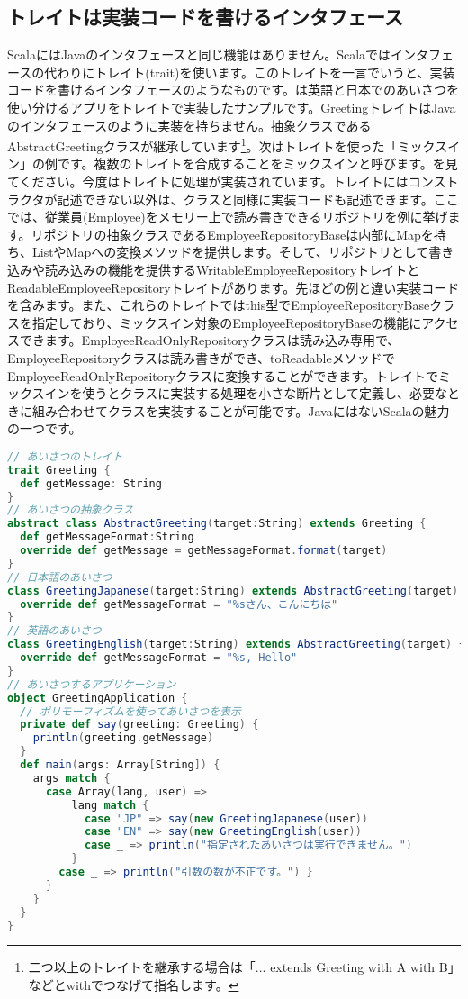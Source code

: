 \subsection{トレイトは実装コードを書けるインタフェース}
ScalaにはJavaのインタフェースと同じ機能はありません。Scalaではインタフェースの代わりにトレイト(trait)を使います。このトレイトを一言でいうと、実装コードを書けるインタフェースのようなものです。は英語と日本でのあいさつを使い分けるアプリをトレイトで実装したサンプルです。GreetingトレイトはJavaのインタフェースのように実装を持ちません。抽象クラスであるAbstractGreetingクラスが継承しています\footnote{二つ以上のトレイトを継承する場合は「... extends Greeting with A with B」 などとwithでつなげて指名します。}。次はトレイトを使った「ミックスイン」の例です。複数のトレイトを合成することをミックスインと呼びます。を見てください。今度はトレイトに処理が実装されています。トレイトにはコンストラクタが記述できない以外は、クラスと同様に実装コードも記述できます。ここでは、従業員(Employee)をメモリー上で読み書きできるリポジトリを例に挙げます。リポジトリの抽象クラスであるEmployeeRepositoryBaseは内部にMapを持ち、ListやMapへの変換メソッドを提供します。そして、リポジトリとして書き込みや読み込みの機能を提供するWritableEmployeeRepositoryトレイトとReadableEmployeeRepositoryトレイトがあります。先ほどの例と違い実装コードを含みます。また、これらのトレイトではthis型でEmployeeRepositoryBaseクラスを指定しており、ミックスイン対象のEmployeeRepositoryBaseの機能にアクセスできます。EmployeeReadOnlyRepositoryクラスは読み込み専用で、EmployeeRepositoryクラスは読み書きができ、toReadableメソッドでEmployeeReadOnlyRepositoryクラスに変換することができます。トレイトでミックスインを使うとクラスに実装する処理を小さな断片として定義し、必要なときに組み合わせてクラスを実装することが可能です。JavaにはないScalaの魅力の一つです。

\begin{lstlisting}[language=scala, label=src:trait, caption=トレイトの利用例。ScalaにはJavaのinterfaceに相当する機能はなく、トレイトを使用する]
// あいさつのトレイト
trait Greeting {
  def getMessage: String
}
// あいさつの抽象クラス
abstract class AbstractGreeting(target:String) extends Greeting {
  def getMessageFormat:String
  override def getMessage = getMessageFormat.format(target)
}
// 日本語のあいさつ
class GreetingJapanese(target:String) extends AbstractGreeting(target) {
  override def getMessageFormat = "%sさん、こんにちは"
}
// 英語のあいさつ
class GreetingEnglish(target:String) extends AbstractGreeting(target) {
  override def getMessageFormat = "%s, Hello"
}
// あいさつするアプリケーション
object GreetingApplication {
  // ポリモーフィズムを使ってあいさつを表示
  private def say(greeting: Greeting) {
    println(greeting.getMessage)
  }
  def main(args: Array[String]) {
    args match {
      case Array(lang, user) =>
          lang match {
            case "JP" => say(new GreetingJapanese(user))
            case "EN" => say(new GreetingEnglish(user))
            case _ => println("指定されたあいさつは実行できません。")
          }
        case _ => println("引数の数が不正です。") }
      }
    }
  }
}
\end{lstlisting}

